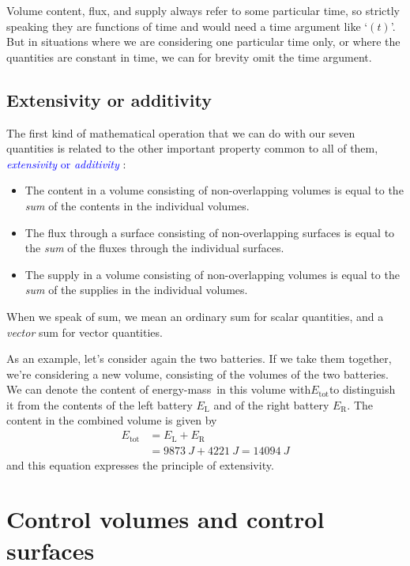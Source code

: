 \documentclass[a4paper,12pt,%
onecolumn,oneside,%
british%
]{memoir}
\renewcommand*{\|}[1][]{\nonscript\:#1\vert\nonscript\:\mathopen{}}
\newcommand*{\sect}{\S}%
\renewcommand*{\autoref}[3][\sect\,\ref]{\textcolor{blue}{#3}
\raisebox{0.6ex}{\color{blue}\miniscule%
\faIcon{angle-right}%
\;#1{#2}\;p.\,\pageref{#2}}}
\newcommand*{\energym}{energy-mass}
\newcommand*{\yE}{E}
\begin{document}
Volume content, flux, and supply always refer to some particular time, so strictly speaking they are functions of time and would need a time argument like \enquote*{$(t)$}. But in situations where we are considering one particular time only, or where the quantities are constant in time, we can for brevity omit the time argument.


\subsection{Extensivity or additivity}
\label{sec:extens_sum}

The first kind of mathematical operation that we can do with our seven quantities is related to the other important property common to all of them, \autoref{def:extensivity}{\emph{extensivity} or \emph{additivity}}:
\begin{itemize}
\item The content in a volume consisting of non-overlapping volumes is equal to the \emph{sum} of the contents in the individual volumes.
\item The flux through a surface consisting of non-overlapping surfaces is equal to the \emph{sum} of the fluxes through the individual surfaces.
\item The supply in a volume consisting of non-overlapping volumes is equal to the \emph{sum} of the supplies in the individual volumes.
\end{itemize}
When we speak of sum, we mean an ordinary sum for scalar quantities, and a \emph{vector} sum for vector quantities.

As an example, let's consider again the two batteries. If we take them together, we're considering a new volume, consisting of the volumes of the two batteries. We can denote the content of \energym\ in this volume with\enskip$\yE_{\text{tot}}$\enskip to distinguish it from the contents of the left battery $\yE_{\text{L}}$ and of the right battery $\yE_{\text{R}}$. The content in the combined volume is given by
\begin{equation*}
  \begin{split}
    \yE_{\text{tot}} &= \yE_{\text{L}} + \yE_{\text{R}}
    \\ &= \qty{9873}{J} + \qty{4221}{J}
    = \qty{14094}{J}
  \end{split}
\end{equation*}
and this equation expresses the principle of extensivity.

\section{Control volumes and control surfaces}
\label{sec_controlvolumes_surfaces}
\end{document}
